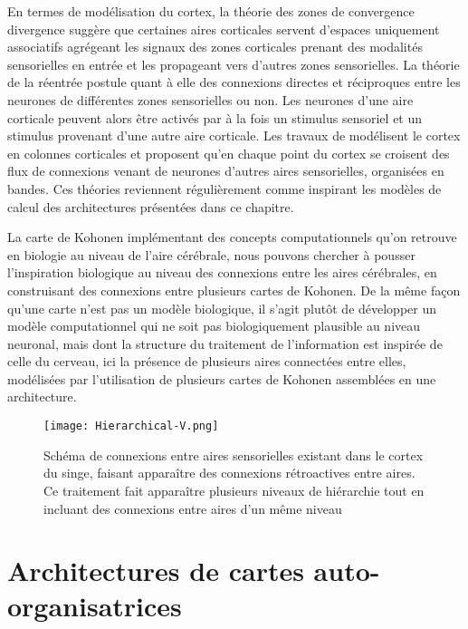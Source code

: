 \documentclass[../main]{subfiles}
\begin{document}
En termes de modélisation du cortex, la théorie des zones de convergence divergence \parencite{damasio_time-locked_1989} suggère que certaines aires corticales servent d'espaces uniquement associatifs agrégeant les signaux des zones corticales prenant des modalités sensorielles en entrée et les propageant vers d'autres zones sensorielles. 
La théorie de la réentrée \parencite{Edelman1982GroupSA} postule quant à elle des connexions directes et réciproques entre les neurones de différentes zones sensorielles ou non. Les neurones d'une aire corticale peuvent alors être activés par à la fois un stimulus sensoriel et un stimulus provenant d'une autre aire corticale.
Les travaux de \cite{Burnod1989AnAN} modélisent le cortex en colonnes corticales et proposent qu'en chaque point du cortex se croisent des flux de connexions venant de neurones d'autres aires sensorielles, organisées en bandes. Ces théories reviennent régulièrement comme inspirant les modèles de calcul des architectures présentées dans ce chapitre.

La carte de Kohonen implémentant des concepts computationnels qu'on retrouve en biologie au niveau de l'aire cérébrale, nous pouvons chercher à pousser l'inspiration biologique au niveau des connexions entre les aires cérébrales, en construisant des connexions entre plusieurs cartes de Kohonen.
De la même façon qu'une carte n'est pas un modèle biologique, il s'agit plutôt de développer un modèle computationnel qui ne soit pas biologiquement plausible au niveau neuronal, mais dont la structure du traitement de l'information est inspirée de celle du cerveau, ici la présence de plusieurs aires connectées entre elles, modélisées par l'utilisation de plusieurs cartes de Kohonen assemblées en une architecture.

\begin{figure}
    \centering
    \texttt{[image: Hierarchical-V.png]}
    \caption{Schéma de connexions entre aires sensorielles existant dans le cortex du singe, faisant apparaître des connexions rétroactives entre aires. Ce traitement fait apparaître plusieurs niveaux de hiérarchie tout en incluant des connexions entre aires d'un même niveau \parencite{primate_cortex_91}\label{fig:primate}}
\end{figure}


\section{Architectures de cartes auto-organisatrices}
\end{document}
